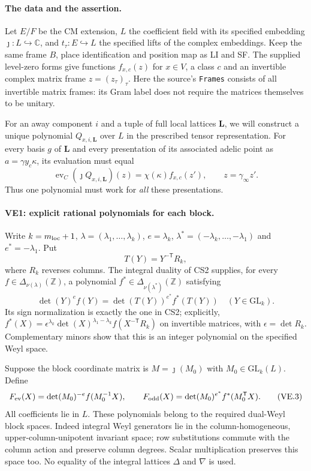 \documentclass[11pt,a4paper]{article}
\numberwithin{equation}{section}
\theoremstyle{remark}\newtheorem{remark}[theorem]{Remark}
\begin{document}
\paragraph{The data and the assertion.}
Let $E/F$ be the CM extension, $L$ the coefficient field with its
specified embedding $\jmath:L\hookrightarrow\mathbb C$, and
$t_\tau:E\hookrightarrow L$ the specified lifts of the complex
embeddings. Keep the same frame $B$, place identification and position
map as LI and SF. The supplied level-zero forms give functions
$f_{x,c}(z)$ for $x\in V$, a class $c$ and an invertible complex
matrix frame $z=(z_\tau)_\tau$. Here the source's
\texttt{Frames} consists of all invertible matrix frames: its Gram
label does not require the matrices themselves to be unitary.

For an away component $i$ and a tuple of full local lattices
$\mathbf L$, we will construct a unique polynomial
$Q_{x,i,\mathbf L}$ over $L$ in the prescribed tensor representation.
For every basis $g$ of $\mathbf L$ and every presentation of its
associated adelic point as $a=\gamma y_c\kappa$, its evaluation must
equal
\[
 \operatorname{ev}_C(\jmath Q_{x,i,\mathbf L})(z)
       =\chi(\kappa)f_{x,c}(z'),\qquad z=\gamma_\infty z'.
                                                        \tag{VE.1}
\]
Thus one polynomial must work for \emph{all} these presentations.

\paragraph{VE1: explicit rational polynomials for each block.}
Write $k=m_{\rm loc}+1$, $\lambda=(\lambda_1,\ldots,\lambda_k)$,
$e=\lambda_k$, $\lambda^*=(-\lambda_k,\ldots,-\lambda_1)$ and
$e^*=-\lambda_1$. Put
\[
 T(Y)=Y^{-\mathsf T}R_k,
\]
where $R_k$ reverses columns. The integral duality of CS2 supplies,
for every $f\in\Delta_{\nu(\lambda)}(\mathbb Z)$, a polynomial
$f^*\in\Delta_{\nu(\lambda^*)}(\mathbb Z)$ satisfying
\[
 \det(Y)^e f(Y)=\det(T(Y))^{e^*}f^*(T(Y))
       \quad(Y\in\mathrm{GL}_k).
                                                        \tag{VE.2}
\]
Its sign normalization is exactly the one in CS2; explicitly,
$f^*(X)=\epsilon^{\lambda_k}\det(X)^{\lambda_1-\lambda_k}
f(X^{-\mathsf T}R_k)$ on invertible matrices, with
$\epsilon=\det R_k$. Complementary minors show that this is an
integer polynomial on the specified Weyl space.

Suppose the block coordinate matrix is $M=\jmath(M_0)$ with
$M_0\in\mathrm{GL}_k(L)$. Define
\[
 F_{\rm ev}(X)=\det(M_0)^{-e}f(M_0^{-1}X),\qquad
 F_{\rm odd}(X)=\det(M_0)^{e^*}f^*(M_0^{\mathsf T}X).
                                                        \tag{VE.3}
\]
All coefficients lie in $L$. These polynomials belong to the
required dual-Weyl block spaces. Indeed integral Weyl generators lie
in the column-homogeneous, upper-column-unipotent invariant space;
row substitutions commute with the column action and preserve
column degrees. Scalar multiplication preserves this space too.
No equality of the integral lattices $\Delta$ and $\nabla$ is used.
\end{document}
